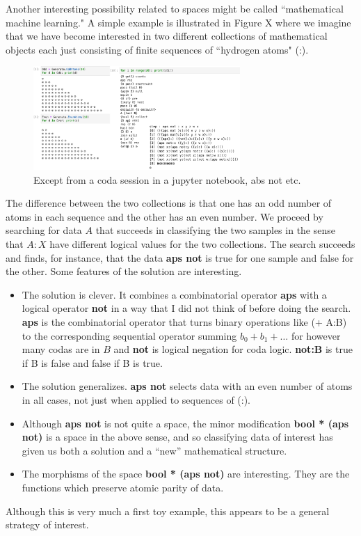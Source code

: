 \documentclass[11pt]{article}
\begin{document}
     Another interesting possibility related to spaces might be called ``mathematical machine learning."  A simple 
example is illustrated in Figure X where we imagine that we have become interested in two different 
collections of mathematical objects each just consisting of finite sequences of ``hydrogen atoms" (:).  
\begin{figure}[h]
\centering
\includegraphics[width=0.7\textwidth]{machine_learning.png}
\caption{Except from a coda session in a jupyter notebook\cite{github}, abs not etc.}
\end{figure} 
The difference between the two collections is that one has an odd number of atoms in each sequence and 
the other has an even number.  We proceed by searching for data $A$ that succeeds in classifying 
the two samples in the sense that $A:X$ have different logical values for the two collections.  The search 
succeeds and finds, for instance, that the data {\bf aps not} is true for one sample and false for the other.  
Some features of the solution are interesting.
\begin{itemize}
\item The solution is clever.  It combines a combinatorial operator {\bf aps} with a logical operator {\bf not} 
in a way that I did not think of before doing the search.  {\bf aps} is the combinatorial operator that turns 
binary operations like (+ A:B) to the corresponding sequential operator summing $b_0+b_1+\dots$ for however
many codas are in $B$ and {\bf not} is logical negation for coda logic.  {\bf not:B} is true if B is false and 
false if B is true.  
\item The solution generalizes.  {\bf aps not} selects data with an even number of atoms in all cases, 
not just when applied to sequences of (:).  
\item Although {\bf aps not} is not quite a space, the minor modification {\bf bool * (aps not)} is a space
in the above sense, and so classifying data of interest has given us both a solution and a ``new'' mathematical structure. 
\item The morphisms of the space {\bf bool * (aps not)} are interesting.  They are the functions 
which preserve atomic parity of data. 
\end{itemize}
Although this is very much a first toy example, this appears to be a general strategy of interest.  
\end{document}
